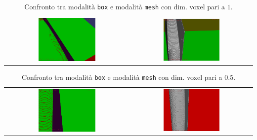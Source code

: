 \begin{center}
\begin{table}[h]
  \begin{tabular}{cc}
   \includegraphics[width=0.48\textwidth]{img/screenshots/pos2_box_v1.png} &%
   \includegraphics[width=0.48\textwidth]{img/screenshots/pos2_mesh_v1_2.png}\\
  \end{tabular}
  \caption{Confronto tra modalità \texttt{box} e modalità \texttt{mesh} con dim. voxel pari a $1$.}
  \label{tab:confrontobm2}
\end{table}
\end{center}

\begin{center}
\begin{table}[h]
  \begin{tabular}{cc}
   \includegraphics[width=0.48\textwidth]{img/screenshots/pos2_box_v05.png} &%
   \includegraphics[width=0.48\textwidth]{img/screenshots/pos2_mesh_v05.png}\\
  \end{tabular}
  \caption{Confronto tra modalità \texttt{box} e modalità \texttt{mesh} con dim. voxel pari a $0.5$.}
  \label{tab:confrontobm3}
\end{table}
\end{center}


